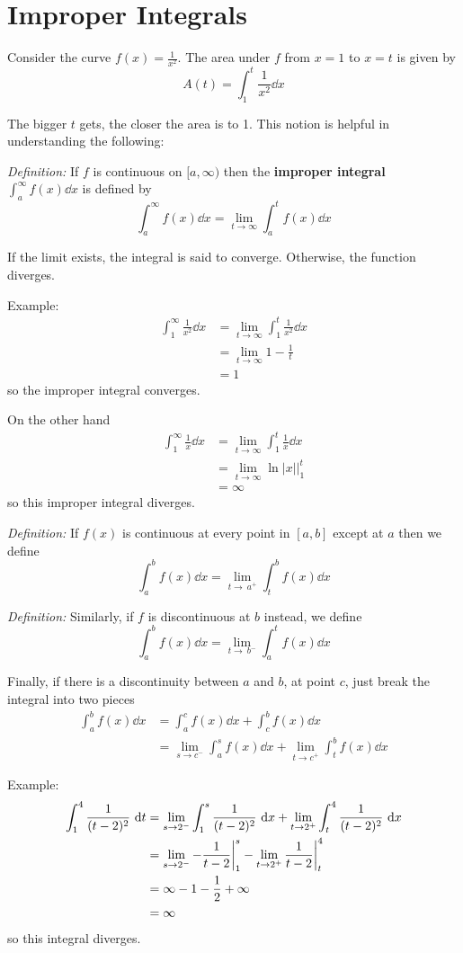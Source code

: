 \documentclass[12pt]{article}
\begin{document}
\section*{Improper Integrals}
Consider the curve $f(x) = \frac{1}{x^2}$. The area under $f$ from $x = 1$ to $x = t$ is given by \[ A(t) = \int_1^t \frac{1}{x^2} \dd x \]

The bigger $t$ gets, the closer the area is to 1. This notion is helpful in understanding the following:

\textit{Definition:} If $f$ is continuous on $[a,\infty)$ then the {\bf improper integral} $\int_a^\infty f(x) \dd x$ is defined by \[ \int_a^\infty f(x) \dd x = \lim_{t\to\infty} \int_a^t f(x) \dd x \]

If the limit exists, the integral is said to converge. Otherwise, the function diverges.

Example:
\begin{align*}
\int_1^\infty \frac{1}{x^2} \dd x &= \lim_{t\to\infty} \int_1^t \frac{1}{x^2} \dd x\\
&= \lim_{t\to\infty} 1-\frac{1}{t}\\
&= 1
\end{align*}
so the improper integral converges.

On the other hand
\begin{align*}
\int_1^\infty \frac{1}{x} \dd x &= \lim_{t\to\infty} \int_1^t \frac{1}{x} \dd x\\
&= \lim_{t\to\infty} \ln|x| \bigg|_1^t\\
&= \infty
\end{align*}
so this improper integral diverges.

\textit{Definition:} If $f(x)$ is continuous at every point in $[a,b]$ except at $a$ then we define \[ \int_a^b f(x) \dd x = \lim_{t\to\ a^+} \int_t^b f(x) \dd x \]

\textit{Definition:} Similarly, if $f$ is discontinuous at $b$ instead, we define \[ \int_a^b f(x) \dd x = \lim_{t\to\ b^-} \int_a^t f(x) \dd x \]

Finally, if there is a discontinuity between $a$ and $b$, at point $c$, just break the integral into two pieces
\begin{align*}
\int_a^b f(x) \dd x &= \int_a^c f(x) \dd x + \int_c^b f(x) \dd x\\
&= \lim_{s\to c^-} \int_a^s f(x) \dd x + \lim_{t\to c^+} \int_t^b f(x) \dd x
\end{align*}

Example:
\begin{align*}
\int_1^4 \frac{1}{(t-2)^2} \ {\rm d} t &= \lim_{s\to 2^-} \int_1^s \frac{1}{(t-2)^2} \ {\rm d} x + \lim_{t\to 2^+} \int_t^4 \frac{1}{(t-2)^2} \ {\rm d} x\\
&= \lim_{s\to 2^-} -\frac{1}{t-2} \bigg|_1^s - \lim_{t\to 2^+} \frac{1}{t-2} \bigg|_t^4\\
&= \infty - 1 - \frac{1}{2} + \infty\\
&= \infty
\end{align*}
so this integral diverges.
\end{document}
